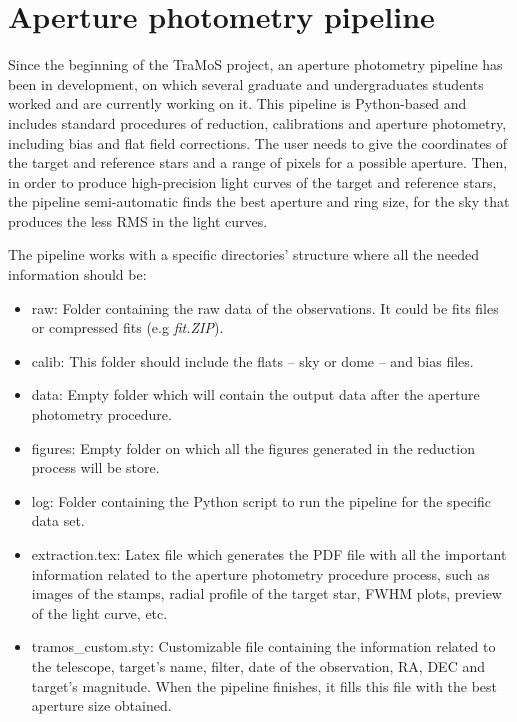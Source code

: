 \chapter{Aperture photometry pipeline}\label{chap:pipeline}

Since the beginning of the TraMoS project, an aperture photometry pipeline has been in development, on which several graduate and undergraduates students worked and are currently working on it. This pipeline is Python-based and includes standard procedures of reduction, calibrations and aperture photometry, including bias and flat field corrections. The user needs to give the coordinates of the target and reference stars and a range of pixels for a possible aperture. Then, in order to produce high-precision light curves of the target and reference stars, the pipeline semi-automatic finds the best aperture and ring size, for the sky that produces the less RMS in the light curves. 

The pipeline works with a specific directories' structure where all the needed information should be:
\begin{itemize}
\item raw: Folder containing the raw data of the observations. It could be fits files or compressed fits (e.g \textit{fit.ZIP}).
\item calib: This folder should include the flats -- sky or dome -- and bias files.
\item data: Empty folder which will contain the output data after the aperture photometry procedure.
\item figures: Empty folder on which all the figures generated in the reduction process will be store.
\item log: Folder containing the Python script to run the pipeline for the specific data set.
\item extraction.tex: Latex file which generates the PDF file with all the important information related to the aperture photometry procedure process, such as images of the stamps, radial profile of the target star, FWHM plots, preview of the light curve, etc.
\item tramos\_custom.sty: Customizable file containing the information related to the telescope, target's name, filter, date of the observation, RA, DEC and target's magnitude. When the pipeline finishes, it fills this file with the best aperture size obtained.
\end{itemize}

